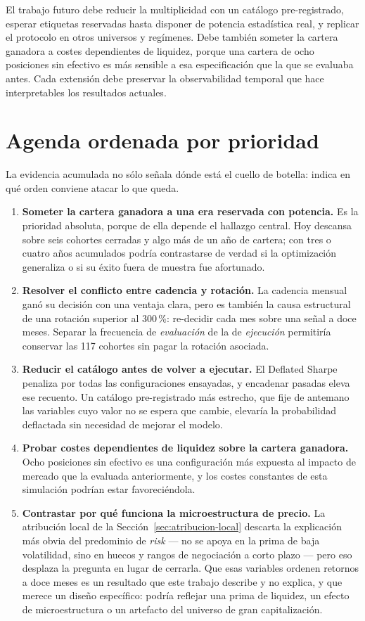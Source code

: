 El trabajo futuro debe reducir la multiplicidad con un catálogo pre-registrado, esperar etiquetas
reservadas hasta disponer de potencia estadística real, y replicar el protocolo en otros universos y
regímenes. Debe también someter la cartera ganadora a costes dependientes de liquidez, porque una
cartera de ocho posiciones sin efectivo es más sensible a esa especificación que la que se evaluaba
antes. Cada extensión debe preservar la observabilidad temporal que hace interpretables los
resultados actuales.

\section{Agenda ordenada por prioridad}

La evidencia acumulada no sólo señala dónde está el cuello de botella: indica en qué orden conviene
atacar lo que queda.

\begin{enumerate}[leftmargin=*,itemsep=0.4em]
  \item \textbf{Someter la cartera ganadora a una era reservada con potencia.} Es la prioridad
  absoluta, porque de ella depende el hallazgo central. Hoy descansa sobre seis cohortes cerradas y
  algo más de un año de cartera; con tres o cuatro años acumulados podría contrastarse de verdad si
  la optimización generaliza o si su éxito fuera de muestra fue afortunado.
  \item \textbf{Resolver el conflicto entre cadencia y rotación.} La cadencia mensual ganó su
  decisión con una ventaja clara, pero es también la causa estructural de una rotación superior al
  300\,\%: re-decidir cada mes sobre una señal a doce meses. Separar la frecuencia de
  \emph{evaluación} de la de \emph{ejecución} permitiría conservar las 117 cohortes sin pagar la
  rotación asociada.
  \item \textbf{Reducir el catálogo antes de volver a ejecutar.} El Deflated Sharpe penaliza por
  todas las configuraciones ensayadas, y encadenar pasadas eleva ese recuento. Un catálogo
  pre-registrado más estrecho, que fije de antemano las variables cuyo valor no se espera que
  cambie, elevaría la probabilidad deflactada sin necesidad de mejorar el modelo.
  \item \textbf{Probar costes dependientes de liquidez sobre la cartera ganadora.} Ocho posiciones
  sin efectivo es una configuración más expuesta al impacto de mercado que la evaluada
  anteriormente, y los costes constantes de esta simulación podrían estar favoreciéndola.
  \item \textbf{Contrastar por qué funciona la microestructura de precio.} La atribución local de la
  Sección~\ref{sec:atribucion-local} descarta la explicación más obvia del predominio de
  \textit{risk} --- no se apoya en la prima de baja volatilidad, sino en huecos y rangos de
  negociación a corto plazo --- pero eso desplaza la pregunta en lugar de cerrarla. Que esas
  variables ordenen retornos a doce meses es un resultado que este trabajo describe y no explica, y
  que merece un diseño específico: podría reflejar una prima de liquidez, un efecto de
  microestructura o un artefacto del universo de gran capitalización.
\end{enumerate}

